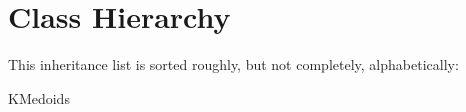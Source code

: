 \section{Class Hierarchy}
This inheritance list is sorted roughly, but not completely, alphabetically\+:\begin{DoxyCompactList}
\item K\+Medoids\begin{DoxyCompactList}
\item {}
\end{DoxyCompactList}
\end{DoxyCompactList}
